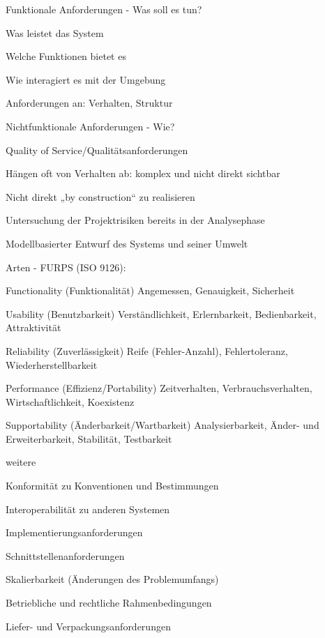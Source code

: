 \documentclass[a4paper]{article}
\begin{document}
\begin{multicols}{3}
  Funktionale Anforderungen - Was soll es tun?
  \begin{itemize*}
    \item Was leistet das System
    \item Welche Funktionen bietet es
    \item Wie interagiert es mit der Umgebung
    \item Anforderungen an: Verhalten, Struktur
  \end{itemize*}

  Nichtfunktionale Anforderungen - Wie?
  \begin{itemize*}
    \item Quality of Service/Qualitätsanforderungen
    \item Hängen oft von Verhalten ab: komplex und nicht direkt sichtbar
    \item Nicht direkt „by construction“ zu realisieren
    \item Untersuchung der Projektrisiken bereits in der Analysephase
    \item Modellbasierter Entwurf des Systems und seiner Umwelt
    \item Arten - FURPS (ISO 9126):
    \begin{description*}
      \item[Functionality] (Funktionalität) Angemessen, Genauigkeit, Sicherheit
      \item[Usability] (Benutzbarkeit) Verständlichkeit, Erlernbarkeit, Bedienbarkeit, Attraktivität
      \item[Reliability] (Zuverlässigkeit) Reife (Fehler-Anzahl), Fehlertoleranz, Wiederherstellbarkeit
      \item[Performance] (Effizienz/Portability) Zeitverhalten, Verbrauchsverhalten, Wirtschaftlichkeit, Koexistenz
      \item[Supportability] (Änderbarkeit/Wartbarkeit) Analysierbarkeit, Änder- und Erweiterbarkeit, Stabilität, Testbarkeit
    \end{description*}
    \item weitere
    \begin{itemize*}
      \item Konformität zu Konventionen und Bestimmungen
      \item Interoperabilität zu anderen Systemen
      \item Implementierungsanforderungen
      \item Schnittstellenanforderungen
      \item Skalierbarkeit (Änderungen des Problemumfangs)
      \item Betriebliche und rechtliche Rahmenbedingungen
      \item Liefer- und Verpackungsanforderungen
    \end{itemize*}
  \end{itemize*}


\end{multicols}
\end{document}
